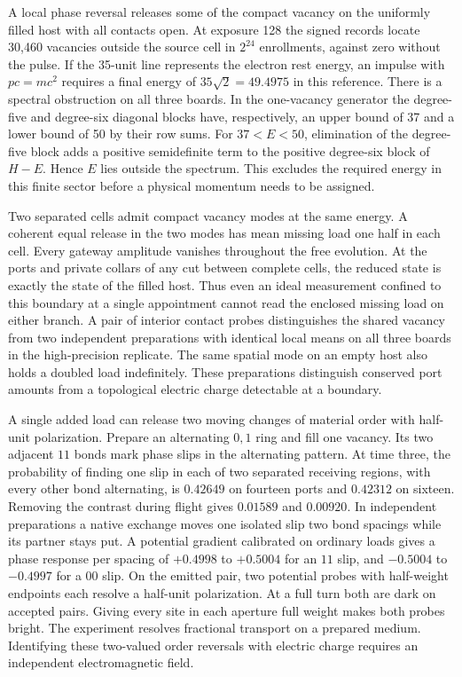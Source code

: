 \documentclass[11pt]{article}
\theoremstyle{definition}
\theoremstyle{remark}
\theoremstyle{plain}
\begin{document}
A local phase reversal releases some of the compact vacancy on the
uniformly filled host with all contacts open. At exposure 128 the
signed records locate 30,460 vacancies outside the source cell in
$2^{24}$ enrollments, against zero without the pulse. If the 35-unit
line represents the electron rest energy, an impulse with $pc=mc^2$
requires a final energy of $35\sqrt{2}=49.4975$ in this reference.
There is a spectral obstruction on all three boards. In the one-vacancy
generator the degree-five and degree-six diagonal blocks have,
respectively, an upper bound of 37 and a lower bound of 50 by their
row sums. For $37<E<50$, elimination of the degree-five block adds a
positive semidefinite term to the positive degree-six block of $H-E$.
Hence $E$ lies outside the spectrum. This excludes the required energy
in this finite sector before a physical momentum needs to be assigned.

Two separated cells admit compact vacancy modes at the same energy.
A coherent equal release in the two modes has mean missing load one
half in each cell. Every gateway amplitude vanishes throughout the
free evolution. At the ports and private collars of any cut between
complete cells, the reduced state is exactly the state of the filled
host. Thus even an ideal measurement confined to this boundary at a
single appointment cannot read the enclosed missing load on either
branch. A pair of interior contact probes distinguishes the shared
vacancy from two independent preparations with identical local means
on all three boards in the high-precision replicate. The same spatial
mode on an empty host also holds a doubled
load indefinitely. These preparations distinguish conserved port
amounts from a topological electric charge detectable at a boundary.

A single added load can release two moving changes of material order
with half-unit polarization. Prepare an alternating $0,1$ ring and fill
one vacancy. Its two adjacent $11$ bonds mark phase slips in the
alternating pattern. At time three, the probability of finding one
slip in each of two separated receiving regions, with every other bond
alternating, is $0.42649$ on fourteen ports and $0.42312$ on sixteen.
Removing the contrast during flight gives $0.01589$ and $0.00920$.
In independent preparations a native exchange moves one isolated slip
two bond spacings while its partner stays put. A potential gradient
calibrated on ordinary loads gives a phase response per spacing of
$+0.4998$ to $+0.5004$ for an $11$ slip, and $-0.5004$ to $-0.4997$
for a $00$ slip. On the emitted pair, two potential probes with
half-weight endpoints each resolve a half-unit polarization. At a
full turn both are dark on accepted pairs. Giving every site in each
aperture full weight makes both probes bright. The experiment resolves
fractional transport on a prepared medium. Identifying these
two-valued order reversals with electric charge requires an independent
electromagnetic field.
\end{document}
